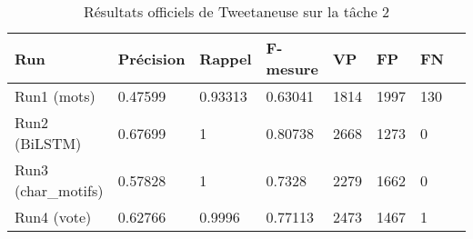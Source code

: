 \begin{table}
\begin{tabular}{l|l|l|l|l|l|l|l}
Run		& Précision	& Rappel& F-mesure	& VP 	&FP 	&FN\\
\hline
\hline
\hline
Run1 (mots)   	&0.47599 	&0.93313 	&0.63041	&1814	&1997	&130\\
Run2 (BiLSTM) 	&0.67699	&1		&0.80738	&2668	&1273	&0\\
Run3 (char\_motifs) 	&0.57828&1  		&0.7328 	&2279	&1662	&0\\
Run4 (vote) 	&0.62766  	&0.9996  	&0.77113 	&2473	&1467	&1


\end{tabular}
\caption{Résultats officiels de Tweetaneuse sur la tâche 2}
\end{table}
